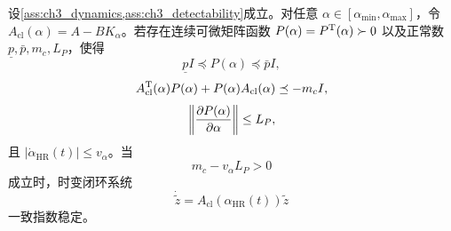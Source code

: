\begin{theorem}[慢变仲裁参数下的一致指数稳定性]
\label{thm:ch3_timevarying_stability}
设\cref{ass:ch3_dynamics,ass:ch3_detectability}成立。对任意 $\alpha\in[\alpha_{\min},\alpha_{\max}]$，令 $A_{\mathrm{cl}}(\alpha)=A-BK_\alpha$。若存在连续可微矩阵函数 $P(\alpha)=P^{\mathrm{T}}(\alpha)\succ0$ 以及正常数 $\underline p,\bar p,m_c,L_P$，使得
\begin{equation}
  \underline p I\preceq P(\alpha)\preceq \bar p I,
  \label{eq:ch3_P_bounds}
\end{equation}
\begin{equation}
  A_{\mathrm{cl}}^{\mathrm{T}}(\alpha)P(\alpha)+P(\alpha)A_{\mathrm{cl}}(\alpha)\preceq -m_cI,
  \label{eq:ch3_dissipation_margin}
\end{equation}
\begin{equation}
  \left\lVert \frac{\partial P(\alpha)}{\partial\alpha}\right\rVert\le L_P,
  \label{eq:ch3_P_lipschitz}
\end{equation}
且 $|\dot\alpha_{\mathrm{HR}}(t)|\le v_\alpha$。当
\begin{equation}
  m_c-v_\alpha L_P>0
  \label{eq:ch3_slow_condition}
\end{equation}
成立时，时变闭环系统
\begin{equation}
  \dot{\tilde z}=A_{\mathrm{cl}}(\alpha_{\mathrm{HR}}(t))\tilde z
  \label{eq:ch3_timevarying_closed}
\end{equation}
一致指数稳定。
\end{theorem}


